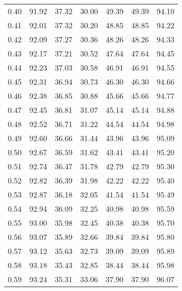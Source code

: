 \begin{tabular}{|c|c|c|c|c|c|c|}
      0.40 &     91.92 &     37.32 &      30.00 &   49.39 &      49.39 &         94.10 \\
      0.41 &     92.01 &     37.32 &      30.20 &   48.85 &      48.85 &         94.22 \\
      0.42 &     92.09 &     37.27 &      30.36 &   48.26 &      48.26 &         94.33 \\
      0.43 &     92.17 &     37.21 &      30.52 &   47.64 &      47.64 &         94.45 \\
      0.44 &     92.23 &     37.03 &      30.58 &   46.91 &      46.91 &         94.55 \\
      0.45 &     92.31 &     36.94 &      30.73 &   46.30 &      46.30 &         94.66 \\
      0.46 &     92.38 &     36.85 &      30.88 &   45.66 &      45.66 &         94.77 \\
      0.47 &     92.45 &     36.81 &      31.07 &   45.14 &      45.14 &         94.88 \\
      0.48 &     92.52 &     36.71 &      31.22 &   44.54 &      44.54 &         94.98 \\
      0.49 &     92.60 &     36.66 &      31.44 &   43.96 &      43.96 &         95.09 \\
      0.50 &     92.67 &     36.59 &      31.62 &   43.41 &      43.41 &         95.20 \\
      0.51 &     92.74 &     36.47 &      31.78 &   42.79 &      42.79 &         95.30 \\
      0.52 &     92.82 &     36.39 &      31.98 &   42.22 &      42.22 &         95.40 \\
      0.53 &     92.87 &     36.18 &      32.05 &   41.54 &      41.54 &         95.49 \\
      0.54 &     92.94 &     36.09 &      32.25 &   40.98 &      40.98 &         95.59 \\
      0.55 &     93.00 &     35.98 &      32.45 &   40.38 &      40.38 &         95.70 \\
      0.56 &     93.07 &     35.89 &      32.66 &   39.84 &      39.84 &         95.80 \\
      0.57 &     93.12 &     35.63 &      32.73 &   39.09 &      39.09 &         95.89 \\
      0.58 &     93.18 &     35.43 &      32.85 &   38.44 &      38.44 &         95.98 \\
      0.59 &     93.24 &     35.31 &      33.06 &   37.90 &      37.90 &         96.07 \\

\end{tabular}

